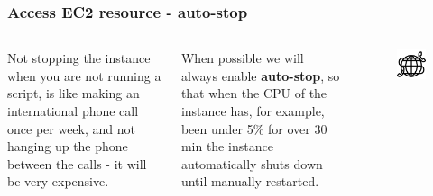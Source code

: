 \documentclass[aspectratio=169]{beamer} %
\begin{document}
\begin{frame}
	\frametitle{Access EC2 resource - auto-stop}

	\begin{columns}[c]


		Not stopping the instance when you are not running a script,
		is like making an international phone call once per week,
		and not hanging up the phone between the calls
		- it will be very expensive.

		\vspace{.5cm}

		When possible we will always enable \textbf{auto-stop},
		so that when the CPU of the instance has,
		for example, been under 5\% for over 30 min the instance
		automatically shuts down until manually restarted.


		\begin{figure}
			\centering
			\includegraphics[width=\textwidth]{./img/international-call.png}
		\end{figure}

	\end{columns}
\end{frame}
\end{document}
